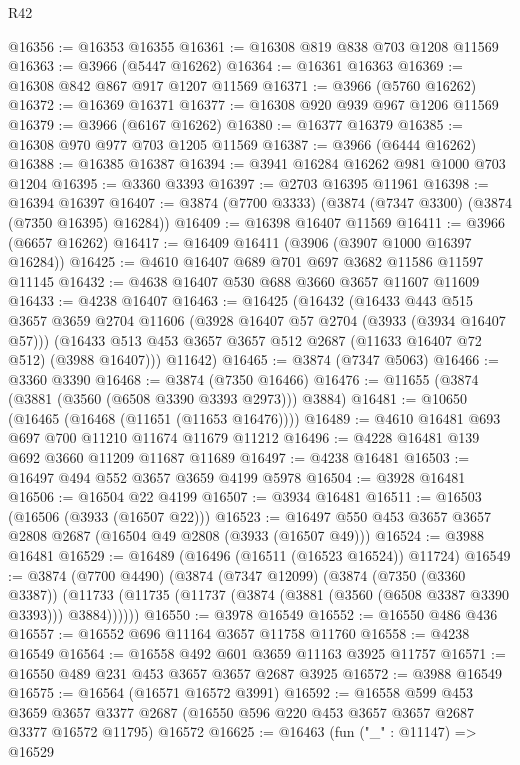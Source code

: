 \begin{lexlean}{R42}
\begin{coremodule}
@16356 := @16353 @16355
@16361 := @16308 @819 @838 @703 @1208 @11569
@16363 := @3966 (@5447 @16262)
@16364 := @16361 @16363
@16369 := @16308 @842 @867 @917 @1207 @11569
@16371 := @3966 (@5760 @16262)
@16372 := @16369 @16371
@16377 := @16308 @920 @939 @967 @1206 @11569
@16379 := @3966 (@6167 @16262)
@16380 := @16377 @16379
@16385 := @16308 @970 @977 @703 @1205 @11569
@16387 := @3966 (@6444 @16262)
@16388 := @16385 @16387
@16394 := @3941 @16284 @16262 @981 @1000 @703 @1204
@16395 := @3360 @3393
@16397 := @2703 @16395 @11961
@16398 := @16394 @16397
@16407 := @3874 (@7700 @3333) (@3874 (@7347 @3300) (@3874 (@7350 @16395) @16284))
@16409 := @16398 @16407 @11569
@16411 := @3966 (@6657 @16262)
@16417 := @16409 @16411 (@3906 (@3907 @1000 @16397 @16284))
@16425 := @4610 @16407 @689 @701 @697 @3682 @11586 @11597 @11145
@16432 := @4638 @16407 @530 @688 @3660 @3657 @11607 @11609
@16433 := @4238 @16407
@16463 := @16425
    (@16432
      (@16433
        @443
        @515
        @3657
        @3659
        @2704
        @11606
        (@3928 @16407 @57 @2704 (@3933 (@3934 @16407 @57)))
        (@16433 @513 @453 @3657 @3657 @512 @2687 (@11633 @16407 @72 @512) (@3988 @16407)))
      @11642)
@16465 := @3874 (@7347 @5063)
@16466 := @3360 @3390
@16468 := @3874 (@7350 @16466)
@16476 := @11655 (@3874 (@3881 (@3560 (@6508 @3390 @3393 @2973))) @3884)
@16481 := @10650 (@16465 (@16468 (@11651 (@11653 @16476))))
@16489 := @4610 @16481 @693 @697 @700 @11210 @11674 @11679 @11212
@16496 := @4228 @16481 @139 @692 @3660 @11209 @11687 @11689
@16497 := @4238 @16481
@16503 := @16497 @494 @552 @3657 @3659 @4199 @5978
@16504 := @3928 @16481
@16506 := @16504 @22 @4199
@16507 := @3934 @16481
@16511 := @16503 (@16506 (@3933 (@16507 @22)))
@16523 := @16497 @550 @453 @3657 @3657 @2808 @2687 (@16504 @49 @2808 (@3933 (@16507 @49)))
@16524 := @3988 @16481
@16529 := @16489 (@16496 (@16511 (@16523 @16524)) @11724)
@16549 := @3874
    (@7700 @4490)
    (@3874
      (@7347 @12099)
      (@3874
        (@7350 (@3360 @3387))
        (@11733 (@11735 (@11737 (@3874 (@3881 (@3560 (@6508 @3387 @3390 @3393))) @3884))))))
@16550 := @3978 @16549
@16552 := @16550 @486 @436
@16557 := @16552 @696 @11164 @3657 @11758 @11760
@16558 := @4238 @16549
@16564 := @16558 @492 @601 @3659 @11163 @3925 @11757
@16571 := @16550 @489 @231 @453 @3657 @3657 @2687 @3925
@16572 := @3988 @16549
@16575 := @16564 (@16571 @16572 @3991)
@16592 := @16558
    @599
    @453
    @3659
    @3657
    @3377
    @2687
    (@16550 @596 @220 @453 @3657 @3657 @2687 @3377 @16572 @11795)
    @16572
@16625 := @16463
    (fun ("_" : @11147) =>
    @16529

\end{coremodule}
\end{lexlean}
